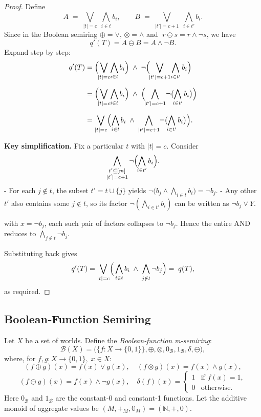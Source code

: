 \begin{proof}
Define
\[
A \;=\; \bigvee_{\lvert t\rvert = c}\;\bigwedge_{i\in t} b_i,
\qquad
B \;=\; \bigvee_{\lvert t'\rvert = c+1}\;\bigwedge_{i\in t'} b_i.
\]
Since in the Boolean semiring \(\oplus=\vee\), \(\otimes=\wedge\) and
\(\;r\ominus s = r\wedge\neg s\), we have
\[
q'(T)
= A \ominus B
= A \wedge \neg B.
\]
Expand step by step:
\begin{align*}
q'(T)
&= \Bigl(\!\bigvee_{\lvert t\rvert = c}\!\bigwedge_{i\in t}b_i\Bigr)
   \;\wedge\;
   \neg\Bigl(\!\bigvee_{\lvert t'\rvert = c+1}\!\bigwedge_{i\in t'}b_i\Bigr)\\[6pt]
&= \Bigl(\!\bigvee_{\lvert t\rvert = c}\!\bigwedge_{i\in t}b_i\Bigr)
   \;\wedge\;
   \Bigl(\!\bigwedge_{\lvert t'\rvert = c+1}\!\neg\bigl(\!\bigwedge_{i\in t'}b_i\bigr)\Bigr)\\[6pt]
&= \bigvee_{\lvert t\rvert = c}
    \Bigl(
      \bigwedge_{i\in t}b_i
      \;\wedge\;
      \bigwedge_{|t'|=c+1}\!\neg\bigl(\!\bigwedge_{i\in t'}b_i\bigr)
    \Bigr).
\end{align*}

\textbf{Key simplification.}  Fix a particular \(t\) with \(\lvert t\rvert=c\).  Consider
\[
\bigwedge_{\substack{t'\subseteq[m]\\|t'|=c+1}}
\neg\Bigl(\!\bigwedge_{i\in t'}b_i\Bigr).
\]
- For each \(j\notin t\), the subset \(t'=t\cup\{j\}\) yields
  \(\neg\bigl(b_j\wedge\bigwedge_{i\in t}b_i\bigr)=\neg b_j\).  
- Any other \(t'\) also contains some \(j\notin t\), so its factor
  \(\neg(\bigwedge_{i\in t'}b_i)\) can be written as
  \(\neg b_j\vee Y\).  

with \(x=\neg b_j\), each such pair of factors collapses to \(\neg b_j\).  Hence the entire
AND reduces to
\(\bigwedge_{j\notin t}\neg b_j\).

Substituting back gives
\[
q'(T)
=\bigvee_{\lvert t\rvert = c}
\Bigl(\,\bigwedge_{i\in t}b_i
       \;\wedge\;
       \bigwedge_{j\notin t}\neg b_j
\Bigr)
=\;q(T),
\]
as required.
\end{proof}
\subsection{Boolean‐Function Semiring}

Let \(X\) be a set of worlds.  
Define the \emph{Boolean‐function m‐semiring}:
\[
  \mathcal{B}(X)
  = \bigl(\{f : X \to \{0,1\}\},\oplus,\otimes,0_{\mathcal{B}},1_{\mathcal{B}},\delta,\ominus\bigr),
\]
where, for \(f,g : X\to\{0,1\},\;x\in X\):
\[
  (f\oplus g)(x)=f(x)\vee g(x), \quad (f\otimes g)(x)=f(x)\wedge g(x),
\]
\[
  (f\ominus g)(x)=f(x)\wedge\neg g(x),\quad \delta(f)(x)=
  \begin{cases}
  1 & \text{if } f(x)=1,\\
  0 & \text{otherwise.}
  \end{cases}
\]
Here \(0_{\mathcal{B}}\) and \(1_{\mathcal{B}}\) are the constant‐0 and constant‐1 functions.  
Let the additive monoid of aggregate values be \((M,+_M,\mathbb{0}_M)=(\mathbb{N},+,0)\).

